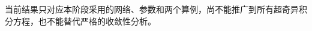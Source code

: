 \documentclass[UTF8,fontset=none,11pt,a4paper]{ctexart}
\newcommand{\Hcorr}{\mathcal H_{\mathrm{corr}}}
\newcommand{\Hunc}{\mathcal H_{\mathrm{unc}}}
\begin{document}
当前结果只对应本阶段采用的网络、参数和两个算例，尚不能推广到所有超奇异积分方程，也不能替代严格的收敛性分析。



\end{document}
